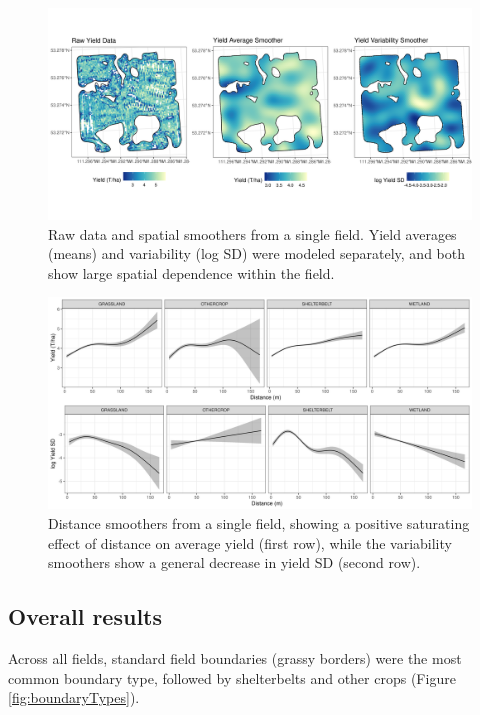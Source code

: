 \documentclass[]{elsarticle} %
\begin{document}
\begin{figure}
\includegraphics[width=1\linewidth]{../Figures/ExamplePlots/spatialSmooths} \caption{Raw data and spatial smoothers from a single field. Yield averages (means) and variability (log SD) were modeled separately, and both show large spatial dependence within the field.}\label{fig:spatialSmooths}
\end{figure}

\begin{figure}
\includegraphics[width=1\linewidth]{../Figures/ExamplePlots/distSmooths} \caption{Distance smoothers from a single field, showing a positive saturating effect of distance on average yield (first row), while the variability smoothers show a general decrease in yield SD (second row).}\label{fig:distSmooths}
\end{figure}

\hypertarget{overall-results}{%
\subsection{Overall results}\label{overall-results}}

Across all fields, standard field boundaries (grassy borders) were the most common boundary type, followed by shelterbelts and other crops (Figure \ref{fig:boundaryTypes}).
\end{document}
